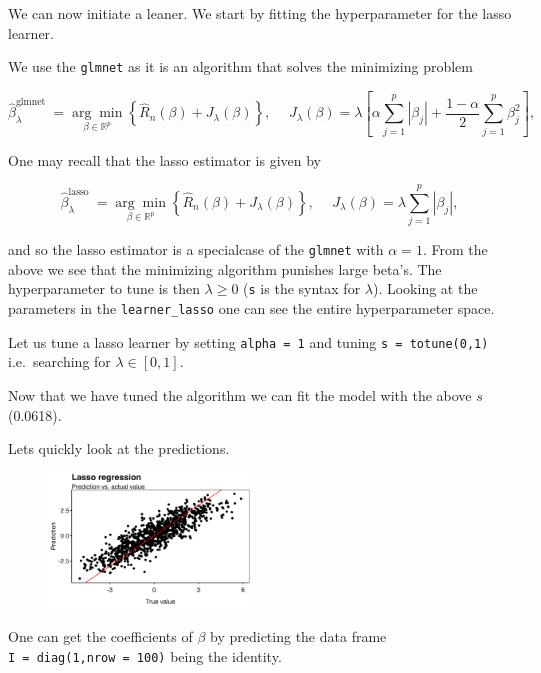 \documentclass[
]{book}
\begin{document}
We can now initiate a leaner. We start by fitting the hyperparameter for the lasso learner.

We use the \texttt{glmnet} as it is an algorithm that solves the minimizing problem

\[
\hat{\beta}_\lambda^{\text {glmnet }} =\underset{\beta \in \mathbb{R}^p}{\arg \min }\left\{\hat{R}_n(\beta)+J_\lambda(\beta)\right\},\hspace{15pt}J_\lambda(\beta)=\lambda \left[\alpha\sum_{j=1}^p\left|\beta_j\right|+\frac{1-\alpha}{2}\sum_{j=1}^p\beta_j^2\right],
\]

One may recall that the lasso estimator is given by

\[
\hat{\beta}_\lambda^{\text {lasso }} =\underset{\beta \in \mathbb{R}^p}{\arg \min }\left\{\hat{R}_n(\beta)+J_\lambda(\beta)\right\},\hspace{15pt}J_\lambda(\beta)=\lambda \sum_{j=1}^p\left|\beta_j\right|,
\]

and so the lasso estimator is a specialcase of the \texttt{glmnet} with \(\alpha=1\). From the above we see that the minimizing algorithm punishes large beta's. The hyperparameter to tune is then \(\lambda\ge 0\) (\texttt{s} is the syntax for \(\lambda\)). Looking at the parameters in the \texttt{learner\_lasso} one can see the entire hyperparameter space.

Let us tune a lasso learner by setting \texttt{alpha\ =\ 1} and tuning \texttt{s\ =\ totune(0,1)} i.e.~searching for \(\lambda \in [0,1]\).

Now that we have tuned the algorithm we can fit the model with the above \(s\) (0.0618).

Lets quickly look at the predictions.

\begin{figure}[H]
  \begin{center}
    \includegraphics[width=0.48\textwidth]{figures/ML_week2_ex1_02.png}
  \end{center}
\end{figure}

One can get the coefficients of \(\beta\) by predicting the data frame \texttt{I\ =\ diag(1,nrow\ =\ 100)} being the identity.
\end{document}
